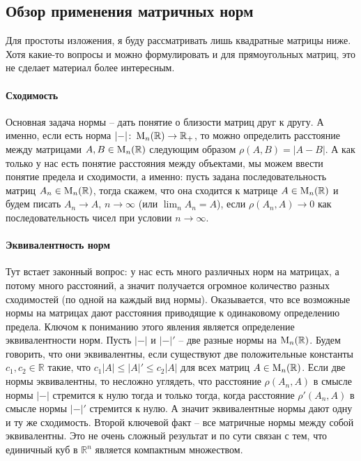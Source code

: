 \subsection{Обзор применения матричных норм}

Для простоты изложения, я буду рассматривать лишь квадратные матрицы ниже.
Хотя какие-то вопросы и можно формулировать и для прямоугольных матриц, это не сделает материал более интересным.

\paragraph{Сходимость}

Основная задача нормы -- дать понятие о близости матриц друг к другу.
А именно, если есть норма $|{-}|\colon \operatorname{M}_{n}(\mathbb R)\to \mathbb R_+$, то можно определить расстояние между матрицами $A, B\in\operatorname{M}_{n}(\mathbb R)$ следующим образом $\rho(A, B) = |A - B|$.
А как только у нас есть понятие расстояния между объектами, мы можем ввести понятие предела и сходимости, а именно: пусть задана последовательность матриц $A_n\in\operatorname{M}_{n}(\mathbb R)$, тогда скажем, что она сходится к матрице $A\in\operatorname{M}_{n}(\mathbb R)$ и будем писать $A_n\to A$, $n\to \infty$ (или $\lim_n A_n = A$), если $\rho(A_n, A)\to 0$ как последовательность чисел при условии $n\to \infty$.

\paragraph{Эквивалентность норм}

Тут встает законный вопрос: у нас есть много различных норм на матрицах, а потому много расстояний, а значит получается огромное количество разных сходимостей (по одной на каждый вид нормы).
Оказывается, что все возможные нормы на матрицах дают расстояния приводящие к одинаковому определению предела.
Ключом к пониманию этого явления является определение эквивалентности норм.
Пусть $|{-}|$ и $|{-}|'$ -- две разные нормы на $\operatorname{M}_{n}(\mathbb R)$.
Будем говорить, что они эквивалентны, если существуют две положительные константы $c_1, c_2\in\mathbb R$ такие, что $c_1 |A|\leqslant |A|'\leqslant c_2|A|$ для всех матриц $A\in \operatorname{M}_{n}(\mathbb R)$.
Если две нормы эквивалентны, то несложно углядеть, что расстояние $\rho(A_n,A)$ в смысле нормы $|{-}|$ стремится к нулю  тогда и только тогда, когда расстояние $\rho'(A_n,A)$ в смысле нормы $|{-}|'$ стремится к нулю.
А значит эквивалентные нормы дают одну и ту же сходимость.
Второй ключевой факт -- все матричные нормы между собой эквивалентны.
Это не очень сложный результат и по сути связан с тем, что единичный куб в $\mathbb R^n$ является компактным множеством.

